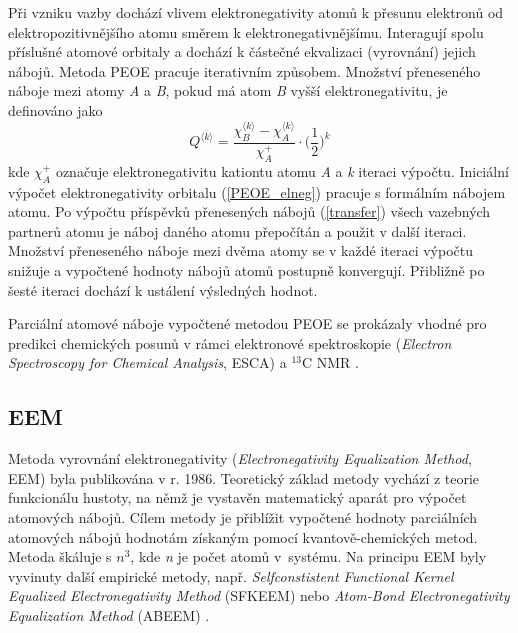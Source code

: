 Při vzniku vazby dochází vlivem elektronegativity atomů k přesunu elektronů od elektropozitivnějšího atomu směrem k elektronegativnějšímu. Interagují spolu přísluš\-né atomové orbitaly a dochází k částečné ekvalizaci (vyrovnání) jejich nábojů. Metoda PEOE pracuje iterativním způsobem. Množ\-ství přeneseného náboje mezi atomy \textit{A} a \textit{B}, pokud má atom \textit{B} vyšší elektronegativitu, je definováno jako 
\begin{equation}
\label{transfer}
    Q^{\langle k \rangle} = \frac{\chi_B^{\langle k \rangle} - \chi_A^{\langle k \rangle}}{\chi_A^+} \cdot \Bigg(\frac{1}{2}\Bigg)^k
\end{equation}
kde $\chi_A^+$ označuje elektronegativitu kationtu atomu \textit{A} a \textit{k} iteraci výpočtu. Iniciální výpočet elektronegativity orbitalu (\ref{PEOE_elneg}) pracuje s formálním nábojem atomu. Po výpočtu příspěvků přenesených nábojů (\ref{transfer}) všech vazebných partnerů atomu je náboj daného atomu přepočítán a použit v další iteraci. Množství přeneseného náboje mezi dvěma atomy se v každé iteraci výpočtu snižuje a vypočtené hodnoty nábojů atomů postupně konvergují. Přibližně po šesté iteraci dochází k ustálení výsledných hodnot. 

Parciální atomové náboje vypočtené metodou PEOE se prokázaly vhodné pro predikci chemických posunů v rámci elektronové spektroskopie (\textit{Electron Spectroscopy for Chemical Analysis}, ESCA) \cite{GM} a ${}^{13}_{}\text{C}$ NMR \cite{PEOE_nmr}. 

\subsection{EEM}
Metoda vyrovnání elektronegativity (\textit{Electronegativity Equalization Method}, EEM) \cite{eem} byla publikována v r. 1986. Teoretický základ metody vychází z teorie funkcionálu hustoty, na němž je vystavěn matematický aparát pro výpočet atomových nábojů. Cílem metody je přiblížit vypočtené hodnoty parciálních atomových nábojů hodnotám získaným pomocí kvantově-chemických metod. Metoda škáluje s $n^3$, kde \textit{n} je počet atomů v~systému. Na principu EEM byly vyvinuty další empirické metody, např. \textit{Selfconstistent Functional Kernel Equalized Electronegativity Method} (SFKEEM) \cite{sfkeem} nebo \textit{Atom-Bond Electronegativity Equalization Method} (ABEEM) \cite{abeem1, abeem2}.

